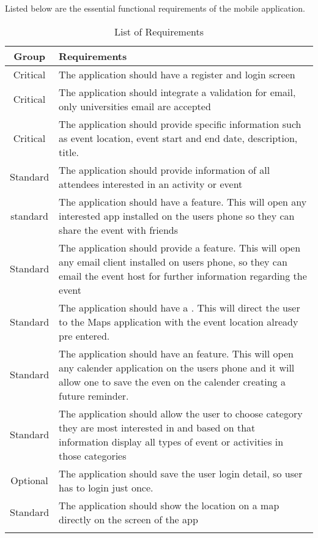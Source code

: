 Listed below are the essential functional requirements of the mobile application.
\pagebreak
\begin{longtable}{| c | L{10cm} |}
			\hline
			Group  & Requirements \\	
			\hline
			Critical & The application should have a register and login screen  \\
			\hline
			Critical & The application should integrate a validation for email, only \newline universities email are accepted  \\
			\hline
			Critical & The application should provide specific information such as event location, event start and end date, description, title.  \\
			\hline
			Standard & The application should provide information of all attendees interested in an activity or event  \\
			\hline
			standard & The application should have a  feature. This will open any interested app installed on the users phone so they can share the event with friends  \\
			\hline
			Standard &  The application should provide a  feature. This will open any email client installed on users phone, so they can email the event host for further information regarding the event  \\
			\hline
			Standard   & The application should have a . This will direct the user to the Maps application with the event location already pre entered.  \\
			\hline
			Standard & The application should have an  feature. This will open any calender application on the users phone and it will allow one to save the even on the calender creating a future reminder.  \\
			\hline
			Standard & The application should allow the user to choose category they are most interested in and based on that information display all types of event or activities in those categories \\
			\hline
			Optional &  The application should save the user login detail, so user has to login just once. \\
			\hline
			Standard & The application should show the location on a map directly on the screen of the app  \\
			\hline
	\caption{List of Requirements}
	\label{table:req_table}
\end{longtable}	
\pagebreak

